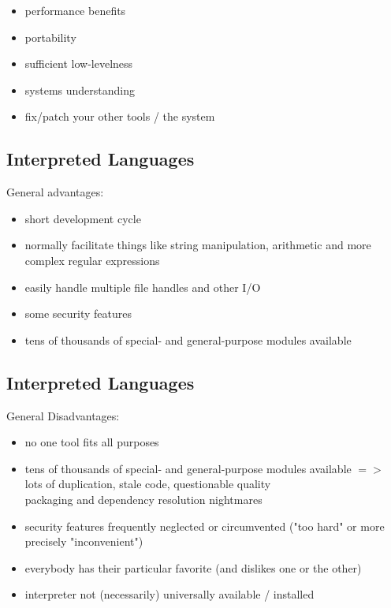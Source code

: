 \documentclass[xga]{xdvislides}
\begin{document}
\begin{itemize}
	\item performance benefits
	\item portability
	\item sufficient low-levelness
	\item systems understanding
	\item fix/patch your other tools / the system
\end{itemize}

\subsection{Interpreted Languages}
General advantages: \\

\begin{itemize}
	\item short development cycle
	\item normally facilitate things like string manipulation, arithmetic and
		more complex regular expressions
	\item easily handle multiple file handles and other I/O
	\item some security features
	\item tens of thousands of special- and general-purpose modules available
\end{itemize}

\subsection{Interpreted Languages}
General Disadvantages: \\

\begin{itemize}
	\item no one tool fits all purposes
	\item tens of thousands of special- and general-purpose modules available $=>$
		lots of duplication, stale code, questionable quality \\
		packaging and dependency resolution nightmares
	\item security features frequently neglected or circumvented ("too hard" or
		more precisely "inconvenient")
	\item everybody has their particular favorite (and dislikes one or the
		other)
	\item interpreter not (necessarily) universally available / installed
\end{itemize}
\end{document}
